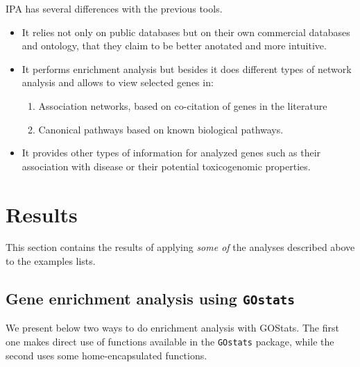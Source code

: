 \documentclass{article}\usepackage[]{graphicx}\usepackage[]{color}
\begin{document}
IPA has several differences with the previous tools.
\begin{itemize}
  \item It relies not only on public databases but on their own commercial databases and ontology, that they claim to be better anotated and more intuitive.
  \item It performs enrichment analysis but besides it does different types of network analysis and allows to view selected genes in:
  \begin{enumerate}
  \item Association networks, based on co-citation of genes in the literature
  \item Canonical pathways based on known biological pathways.
\end{enumerate}
\item It provides other types of information for analyzed genes such as their association with disease or their potential toxicogenomic properties.
\end{itemize}

\section{Results}

This section contains the results of applying \emph{some of} the analyses described above to the examples lists.

\subsection{Gene enrichment analysis using \texttt{GOstats}}

We present below two ways to do enrichment analysis with GOStats.
The first one makes direct use of functions available in the \texttt{GOstats} package, while the second uses some home-encapsulated functions.
\end{document}
